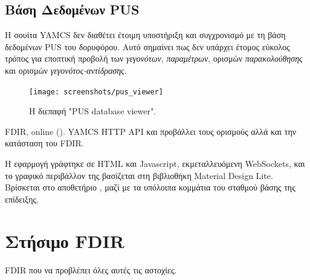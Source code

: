 \documentclass[a4paper,nobib]{tufte-book}
\begin{document}
\subsection{Βάση Δεδομένων \acs{PUS}}
\label{sec:pusinterface}

Η σουίτα \acs{YAMCS} δεν διαθέτει έτοιμη υποστήριξη και συγχρονισμό με τη βάση δεδομένων \acs{PUS} του δορυφόρου. Αυτό σημαίνει πως δεν υπάρχει έτομος εύκολος τρόπος για εποπτική προβολή των \emph{γεγονότων}, \emph{παραμέτρων}, ορισμών \emph{παρακολούθησης} και ορισμών \emph{γεγονότος-αντίδρασης}.

\begin{figure}[h]
	\texttt{[image: screenshots/pus\_viewer]}
	\caption[Η διεπαφή "PUS database viewer"]{Η διεπαφή "\acs{PUS} database viewer". }
	\label{fig:pusviewer}
\end{figure}

 \acs{FDIR},  online  ().  \acs{YAMCS} \acs{HTTP} \acs{API} και προβάλλει τους ορισμούς αλλά και την κατάσταση του \acs{FDIR}.

Η εφαρμογή γράφτηκε σε HTML και Javascript, εκμεταλλευόμενη WebSockets, και το γραφικό περιβάλλον της βασίζεται στη βιβλιοθήκη Material Design Lite. Βρίσκεται στο αποθετήριο , μαζί με τα υπόλοιπα κομμάτια του σταθμού βάσης της επίδειξης.


\section{Στήσιμο \acs{FDIR}}

 \ac{FDIR} που να προβλέπει όλες αυτές τις αστοχίες.
\end{document}
